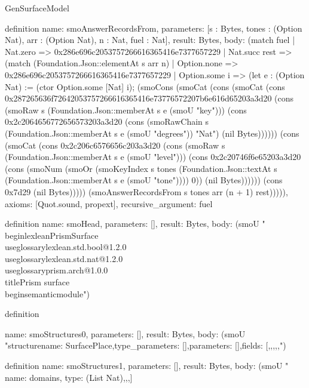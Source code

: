 \begin{lexlean}{GenSurfaceModel}
\begin{semanticmodule}
definition{
  name: smoAnswerRecordsFrom,
  parameters: [s : Bytes, tones : (Option Nat), arr : (Option Nat), n : Nat, fuel : Nat],
  result: Bytes,
  body: (match fuel
    | Nat.zero => 0x286e696c2053757266616365416e7377657229
    | Nat.succ rest => (match (Foundation.Json::elementAt s arr n)
      | Option.none => 0x286e696c2053757266616365416e7377657229
      | Option.some i => (let e : (Option Nat) := (ctor Option.some [Nat] i); (smoCons (smoCat (cons (smoCat (cons 0x287265636f72642053757266616365416e73776572207b6e616d65203a3d20 (cons (smoRaw s (Foundation.Json::memberAt s e (smoU "key"))) (cons 0x2c2064656772656573203a3d20 (cons (smoRawChain s (Foundation.Json::memberAt s e (smoU "degrees")) "Nat") (nil Bytes)))))) (cons (smoCat (cons 0x2c206c6576656c203a3d20 (cons (smoRaw s (Foundation.Json::memberAt s e (smoU "level"))) (cons 0x2c20746f6e65203a3d20 (cons (smoNum (smoOr (smoKeyIndex s tones (Foundation.Json::textAt s (Foundation.Json::memberAt s e (smoU "tone")))) 0)) (nil Bytes)))))) (cons 0x7d29 (nil Bytes))))) (smoAnswerRecordsFrom s tones arr (n + 1) rest))))),
  axioms: [Quot.sound, propext],
  recursive_argument: fuel
}

definition{
  name: smoHead,
  parameters: [],
  result: Bytes,
  body: (smoU "\\begin{lexlean}{PrismSurface}\n\\useglossary{lexlean.std.bool@1.2.0}\n\\useglossary{lexlean.std.nat@1.2.0}\n\\useglossary{prism.arch@1.0.0}\n\\title{Prism surface}\n\\begin{semanticmodule}\n")
}

definition{
  name: smoStructures0,
  parameters: [],
  result: Bytes,
  body: (smoU "structure{\n  name: SurfacePlace,\n  type_parameters: [],\n  parameters: [],\n  fields: [,,,,,\n ")
}

definition{
  name: smoStructures1,
  parameters: [],
  result: Bytes,
  body: (smoU "   {name: domains, type: (List Nat)},,,\n  ]\n}\n{}\n\nstructure{\n  name: SurfaceSetting,\n  type_parameters: [],\n  parameters: [],\n  fields: [\n    {name: name, type: String},\n    {name: viewpoint, type: Nat},\n    {name: kind, type: Nat},\n    {name: group, ty")
}

}}
\end{semanticmodule}
\end{lexlean}
